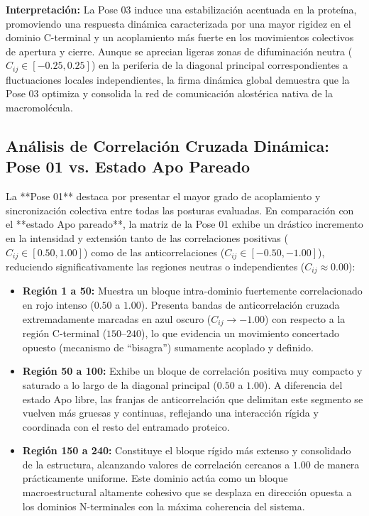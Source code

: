 \textbf{Interpretación:} La Pose 03 induce una estabilización acentuada en la proteína, promoviendo una respuesta dinámica caracterizada por una mayor rigidez en el dominio C-terminal y un acoplamiento más fuerte en los movimientos colectivos de apertura y cierre. Aunque se aprecian ligeras zonas de difuminación neutra ($C_{ij} \in [-0.25, 0.25]$) en la periferia de la diagonal principal correspondientes a fluctuaciones locales independientes, la firma dinámica global demuestra que la Pose 03 optimiza y consolida la red de comunicación alostérica nativa de la macromolécula.

\subsection*{Análisis de Correlación Cruzada Dinámica: Pose 01 vs. Estado Apo Pareado}

La **Pose 01** destaca por presentar el mayor grado de acoplamiento y sincronización colectiva entre todas las posturas evaluadas. En comparación con el **estado Apo pareado**, la matriz de la Pose 01 exhibe un drástico incremento en la intensidad y extensión tanto de las correlaciones positivas ($C_{ij} \in [0.50, 1.00]$) como de las anticorrelaciones ($C_{ij} \in [-0.50, -1.00]$), reduciendo significativamente las regiones neutras o independientes ($C_{ij} \approx 0.00$):

\begin{itemize}
    \item \textbf{Región 1 a 50:} Muestra un bloque intra-dominio fuertemente correlacionado en rojo intenso ($0.50$ a $1.00$). Presenta bandas de anticorrelación cruzada extremadamente marcadas en azul oscuro ($C_{ij} \to -1.00$) con respecto a la región C-terminal ($150$--$240$), lo que evidencia un movimiento concertado opuesto (mecanismo de ``bisagra'') sumamente acoplado y definido.
    
    \item \textbf{Región 50 a 100:} Exhibe un bloque de correlación positiva muy compacto y saturado a lo largo de la diagonal principal ($0.50$ a $1.00$). A diferencia del estado Apo libre, las franjas de anticorrelación que delimitan este segmento se vuelven más gruesas y continuas, reflejando una interacción rígida y coordinada con el resto del entramado proteico.
    
    \item \textbf{Región 150 a 240:} Constituye el bloque rígido más extenso y consolidado de la estructura, alcanzando valores de correlación cercanos a $1.00$ de manera prácticamente uniforme. Este dominio actúa como un bloque macroestructural altamente cohesivo que se desplaza en dirección opuesta a los dominios N-terminales con la máxima coherencia del sistema.
\end{itemize}

